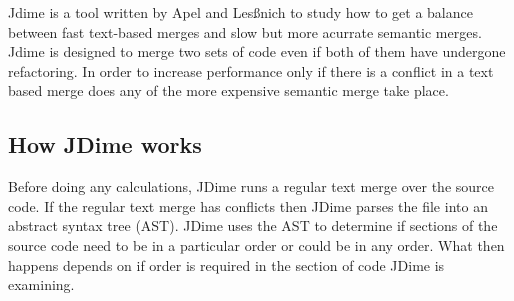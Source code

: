 Jdime is a tool written by  Apel and Les{\ss}nich \cite{Apel2012} \cite{Apel2011} \cite{LeBenich2012} to study how to get a balance between fast text-based merges and slow but more acurrate semantic merges.  Jdime is designed to merge two sets of code even if both of them have undergone refactoring. In order to increase performance only if there is a conflict in a text based merge does any of the more expensive semantic merge take place. 

\subsection{How JDime works}

Before doing any calculations, JDime runs a regular text merge over the source code.  
If the regular text merge has conflicts then JDime parses the file into an abstract syntax tree (AST).  JDime uses the AST to determine if sections of the source code need to be in a particular order or could be in any order.
What then happens depends on if order is required in the section of code JDime is examining.


